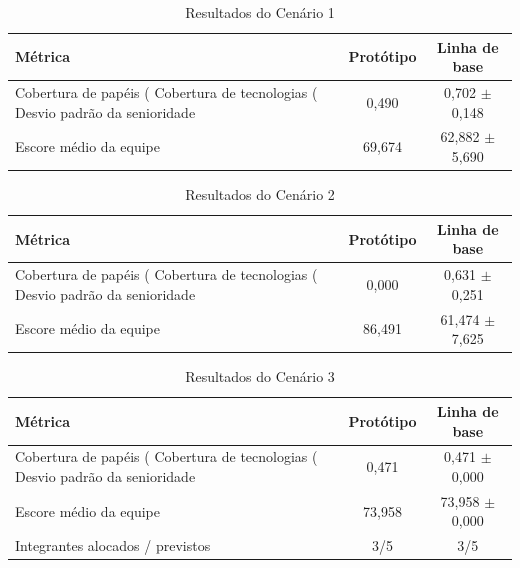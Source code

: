 \begin{table}[htbp]
\centering
\caption{Resultados do Cenário 1}
\label{tab:cenario1}
\begin{tabular}{lcc}
\hline
\textbf{Métrica} & \textbf{Protótipo} & \textbf{Linha de base} \\
\hline
Cobertura de papéis (%
Cobertura de tecnologias (%
Desvio padrão da senioridade & 0,490 & 0,702 $\pm$ 0,148 \\
Escore médio da equipe & 69,674 & 62,882 $\pm$ 5,690 \\
\hline
\end{tabular}
\end{table}

\begin{table}[htbp]
\centering
\caption{Resultados do Cenário 2}
\label{tab:cenario2}
\begin{tabular}{lcc}
\hline
\textbf{Métrica} & \textbf{Protótipo} & \textbf{Linha de base} \\
\hline
Cobertura de papéis (%
Cobertura de tecnologias (%
Desvio padrão da senioridade & 0,000 & 0,631 $\pm$ 0,251 \\
Escore médio da equipe & 86,491 & 61,474 $\pm$ 7,625 \\
\hline
\end{tabular}
\end{table}

\begin{table}[htbp]
\centering
\caption{Resultados do Cenário 3}
\label{tab:cenario3}
\begin{tabular}{lcc}
\hline
\textbf{Métrica} & \textbf{Protótipo} & \textbf{Linha de base} \\
\hline
Cobertura de papéis (%
Cobertura de tecnologias (%
Desvio padrão da senioridade & 0,471 & 0,471 $\pm$ 0,000 \\
Escore médio da equipe & 73,958 & 73,958 $\pm$ 0,000 \\
Integrantes alocados / previstos & 3/5 & 3/5 \\
\hline
\end{tabular}
\end{table}
